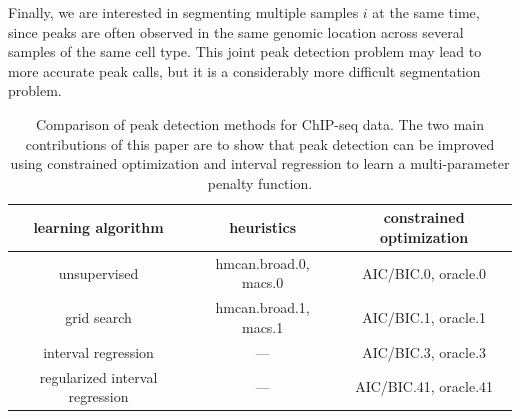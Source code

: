 \documentclass{article}
\begin{document}
Finally, we are interested in segmenting multiple samples $i$ at the
same time, since peaks are often observed in the same genomic location
across several samples of the same cell type. This joint peak
detection problem may lead to more accurate peak calls, but it is a
considerably more difficult segmentation problem.

\begin{table}[b!]
  \centering
  \begin{tabular}{ccc}
    \textbf{learning algorithm} & \textbf{heuristics} & 
    \textbf{constrained optimization} \\
    \hline
    unsupervised & hmcan.broad.0, macs.0 & AIC/BIC.0, oracle.0 \\
    grid search & hmcan.broad.1, macs.1 & AIC/BIC.1, oracle.1 \\
    interval regression & --- & AIC/BIC.3, oracle.3 \\
    regularized interval regression & --- & AIC/BIC.41, oracle.41 \\
  \end{tabular}
  \caption{Comparison of peak detection methods for ChIP-seq data. 
    The two main contributions of this paper 
    are to show that peak detection can be improved 
    using constrained optimization and 
    interval regression to learn a 
    multi-parameter penalty function.}
  \label{tab:supervised-maxlik}
\end{table}




\end{document}
